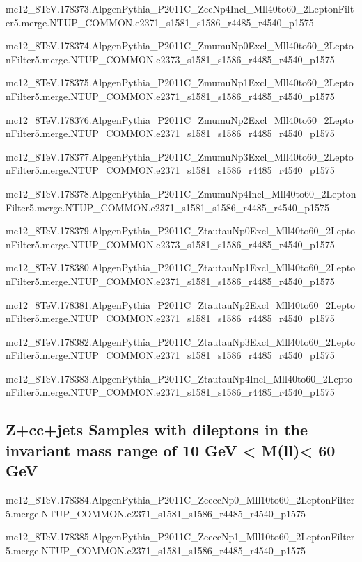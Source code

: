 mc12\_8TeV.178373.AlpgenPythia\_P2011C\_ZeeNp4Incl\_Mll40to60\_2LeptonFilter5.merge.NTUP\_COMMON.e2371\_s1581\_s1586\_r4485\_r4540\_p1575

mc12\_8TeV.178374.AlpgenPythia\_P2011C\_ZmumuNp0Excl\_Mll40to60\_2LeptonFilter5.merge.NTUP\_COMMON.e2373\_s1581\_s1586\_r4485\_r4540\_p1575

mc12\_8TeV.178375.AlpgenPythia\_P2011C\_ZmumuNp1Excl\_Mll40to60\_2LeptonFilter5.merge.NTUP\_COMMON.e2371\_s1581\_s1586\_r4485\_r4540\_p1575

mc12\_8TeV.178376.AlpgenPythia\_P2011C\_ZmumuNp2Excl\_Mll40to60\_2LeptonFilter5.merge.NTUP\_COMMON.e2371\_s1581\_s1586\_r4485\_r4540\_p1575

mc12\_8TeV.178377.AlpgenPythia\_P2011C\_ZmumuNp3Excl\_Mll40to60\_2LeptonFilter5.merge.NTUP\_COMMON.e2371\_s1581\_s1586\_r4485\_r4540\_p1575

mc12\_8TeV.178378.AlpgenPythia\_P2011C\_ZmumuNp4Incl\_Mll40to60\_2LeptonFilter5.merge.NTUP\_COMMON.e2371\_s1581\_s1586\_r4485\_r4540\_p1575

mc12\_8TeV.178379.AlpgenPythia\_P2011C\_ZtautauNp0Excl\_Mll40to60\_2LeptonFilter5.merge.NTUP\_COMMON.e2373\_s1581\_s1586\_r4485\_r4540\_p1575

mc12\_8TeV.178380.AlpgenPythia\_P2011C\_ZtautauNp1Excl\_Mll40to60\_2LeptonFilter5.merge.NTUP\_COMMON.e2371\_s1581\_s1586\_r4485\_r4540\_p1575

mc12\_8TeV.178381.AlpgenPythia\_P2011C\_ZtautauNp2Excl\_Mll40to60\_2LeptonFilter5.merge.NTUP\_COMMON.e2371\_s1581\_s1586\_r4485\_r4540\_p1575

mc12\_8TeV.178382.AlpgenPythia\_P2011C\_ZtautauNp3Excl\_Mll40to60\_2LeptonFilter5.merge.NTUP\_COMMON.e2371\_s1581\_s1586\_r4485\_r4540\_p1575

mc12\_8TeV.178383.AlpgenPythia\_P2011C\_ZtautauNp4Incl\_Mll40to60\_2LeptonFilter5.merge.NTUP\_COMMON.e2371\_s1581\_s1586\_r4485\_r4540\_p1575    



\subsection{Z+cc+jets Samples with dileptons in the invariant mass range of 10 GeV < M(ll)< 60 GeV}

mc12\_8TeV.178384.AlpgenPythia\_P2011C\_ZeeccNp0\_Mll10to60\_2LeptonFilter5.merge.NTUP\_COMMON.e2371\_s1581\_s1586\_r4485\_r4540\_p1575

mc12\_8TeV.178385.AlpgenPythia\_P2011C\_ZeeccNp1\_Mll10to60\_2LeptonFilter5.merge.NTUP\_COMMON.e2371\_s1581\_s1586\_r4485\_r4540\_p1575

